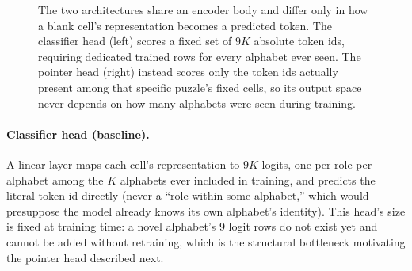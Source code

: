 \documentclass{article} %
\begin{document}
\begin{figure}[h]
\centering
{}
\caption{The two architectures share an encoder body and differ only in
how a blank cell's representation becomes a predicted token. The
classifier head (left) scores a fixed set of $9K$ absolute token ids,
requiring dedicated trained rows for every alphabet ever seen. The
pointer head (right) instead scores only the token ids actually present
among that specific puzzle's fixed cells, so its output space never
depends on how many alphabets were seen during training.}
\label{fig:architectures}
\end{figure}

\paragraph{Classifier head (baseline).} A linear layer maps each cell's
representation to $9K$ logits, one per role per alphabet among the $K$
alphabets ever included in training, and predicts the literal token id
directly (never a ``role within some alphabet,'' which would presuppose
the model already knows its own alphabet's identity). This head's size
is fixed at training time: a novel alphabet's $9$ logit rows do not
exist yet and cannot be added without retraining, which is the
structural bottleneck motivating the pointer head
described next.
\end{document}
